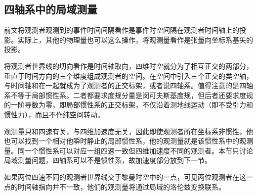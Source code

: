 \documentclass[11pt, a4paper, oneside, onecolumn]{ctexart}
\numberwithin{equation}{subsection}
\begin{document}
\subsection{四轴系中的局域测量}
前文将观测者观测到的事件时间间隔看作是事件时空间隔在观测者时间轴上的投影。实际上，其他的物理量也可以这么操作，将观测量看作是张量向坐标系基矢的投影。

将观测者世界线的切向看作是时间轴取向，四维时空就分为了相互正交的两部分，垂直于时间方向的三个维度组成观测者的空间。在空间中引入三个正交的类空轴，与时间轴和在一起就成为了观测者的正交标架，或者说四轴系。值得注意的是四轴系不等于局部惯性系。二者都要求度规分量是闵可夫斯基度规，但后者还要求度规的一阶导数为零，即局部惯性系的正交标架，不仅沿着测地线运动（即不受引力和惯性力），而且不作纯空间转动。

观测量只和四速有关，与四维加速度无关，因此即使观测者所在坐标系非惯性，他也可以找到一个相对他瞬时静止的局部惯性系，他的观测量就是该惯性系中的观测量。同一个惯性系可以对应一组四速一致但四维加速度不同的观测者。本节只讨论局域测量问题，四轴系可以不是惯性系，故加速度部分放到下一节。

如果两位四速不同的观测者世界线交于黎曼时空中的一点，可见两位观测者在这一点的时间轴指向并不一致，他们的观测量将通过局域的洛伦兹变换联系。
\end{document}
